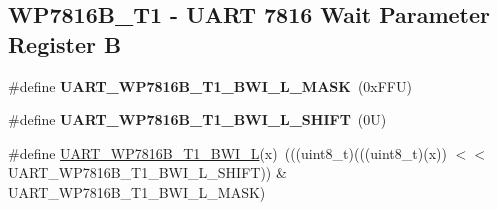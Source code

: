 \subsection*{W\+P7816\+B\+\_\+\+T1 -\/ U\+A\+RT 7816 Wait Parameter Register B}
\begin{DoxyCompactItemize}
\item 
\mbox{\label{group___u_a_r_t___register___masks_ga6289d920dae80049cd133b195116b843}} 
\#define {\bfseries U\+A\+R\+T\+\_\+\+W\+P7816\+B\+\_\+\+T1\+\_\+\+B\+W\+I\+\_\+\+L\+\_\+\+M\+A\+SK}~(0x\+F\+F\+U)
\item 
\mbox{\label{group___u_a_r_t___register___masks_ga207775fc42ffe17d3a5cc5822608ef2a}} 
\#define {\bfseries U\+A\+R\+T\+\_\+\+W\+P7816\+B\+\_\+\+T1\+\_\+\+B\+W\+I\+\_\+\+L\+\_\+\+S\+H\+I\+FT}~(0\+U)
\item 
\#define \mbox{\hyperlink{group___u_a_r_t___register___masks_ga0248c8e1ada933b11672a04e695d25df}{U\+A\+R\+T\+\_\+\+W\+P7816\+B\+\_\+\+T1\+\_\+\+B\+W\+I\+\_\+L}}(x)~(((uint8\+\_\+t)(((uint8\+\_\+t)(x)) $<$$<$ U\+A\+R\+T\+\_\+\+W\+P7816\+B\+\_\+\+T1\+\_\+\+B\+W\+I\+\_\+\+L\+\_\+\+S\+H\+I\+FT)) \& U\+A\+R\+T\+\_\+\+W\+P7816\+B\+\_\+\+T1\+\_\+\+B\+W\+I\+\_\+\+L\+\_\+\+M\+A\+SK)
\end{DoxyCompactItemize}
